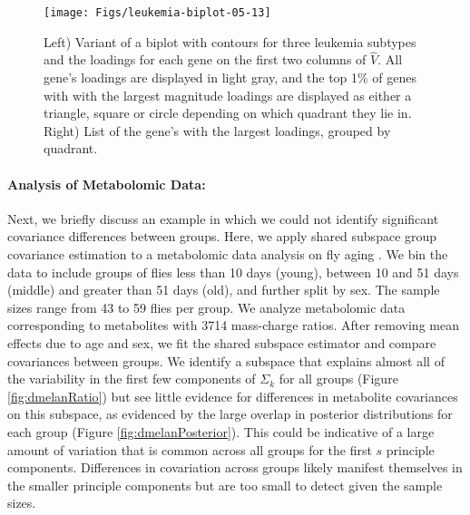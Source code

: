 \documentclass[12pt]{article}
\begin{document}
  \begin{figure}[!ht]
    \centering
    \texttt{[image: Figs/leukemia-biplot-05-13]}
    \qquad
\raisebox{1.25\height}{
\footnotesize

}
\caption{Left) Variant of a biplot with contours for three leukemia
  subtypes and the loadings for each gene on the first two columns of
  $\hat{V}$.  All gene's loadings are displayed in light gray, and the
  top 1\% of genes with with the largest magnitude loadings are
  displayed as either a triangle, square or circle depending on which
  quadrant they lie in.  Right) List of the gene's with the largest
  loadings, grouped by quadrant. }
\label{fig:leukemiaBiplot}
  \end{figure}

\paragraph{Analysis of Metabolomic Data:}

Next, we briefly discuss an example in which we could not identify
significant covariance differences between groups.  Here, we apply
shared subspace group covariance estimation to a metabolomic data
analysis on fly aging \citep{Hoffman2014}.  We bin the data to include
groups of flies less than 10 days (young), between 10 and 51 days
(middle) and greater than 51 days (old), and further split by
sex. The sample sizes range from 43 to 59 flies per group.  We
analyze metabolomic data corresponding to metabolites with 3714
mass-charge ratios.  After removing mean effects due to age and
sex, we fit the shared subspace estimator and compare covariances
between groups.  We identify a subspace that explains almost all of
the variability in the first few components of $\Sigma_k$ for all
groups (Figure \ref{fig:dmelanRatio}) but see little evidence for
differences in metabolite covariances on this subspace, as evidenced
by the large overlap in posterior distributions for each group (Figure
\ref{fig:dmelanPosterior}). This could be indicative of a large amount
of variation that is common across all groups for the first $s$
principle components. Differences in covariation across groups likely
manifest themselves in the smaller principle components but are too
small to detect given the sample sizes.
\end{document}
